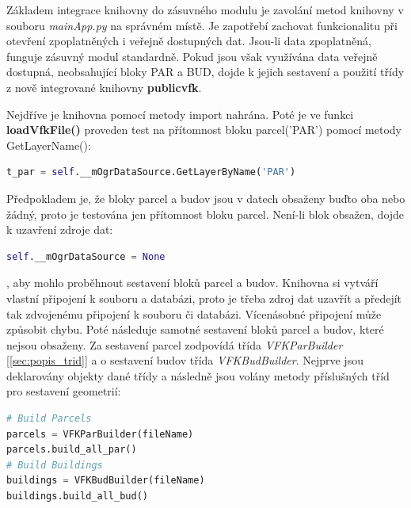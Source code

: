 Základem integrace knihovny do zásuvného modulu je
zavolání metod knihovny v souboru \textit{mainApp.py} na správném místě. Je zapotřebí zachovat
funkcionalitu při otevření zpoplatněných i veřejně dostupných dat. Jsou-li data
zpoplatněná, funguje zásuvný modul standardně. Pokud jsou však využívána data veřejně dostupná,
neobsahující bloky PAR a BUD, dojde k jejich sestavení a použití
třídy z nově integrované knihovny \textbf{publicvfk}.

Nejdříve je knihovna pomocí metody import nahrána. Poté je ve funkci
\textbf{loadVfkFile()} proveden test na přítomnost bloku parcel('PAR')
pomocí metody GetLayerName():
\begin{lstlisting}[language=Python, numbers=none]
t_par = self.__mOgrDataSource.GetLayerByName('PAR')
\end{lstlisting}
Předpokladem je, že bloky parcel a budov jsou v datech obsaženy buďto oba nebo žádný, proto je testována jen přítomnost bloku parcel. Není-li blok obsažen, dojde k uzavření zdroje dat:
\begin{lstlisting}[language=Python, numbers=none]
self.__mOgrDataSource = None
\end{lstlisting}
, aby mohlo proběhnout sestavení bloků parcel a budov. Knihovna si
vytváří vlastní připojení k  souboru a databázi, proto je
třeba zdroj dat uzavřít a předejít tak zdvojenému připojení k 
souboru či databázi. Vícenásobné připojení může způsobit chybu. Poté
následuje samotné sestavení bloků parcel a budov, které nejsou obsaženy. Za
sestavení parcel zodpovídá třída \textit{VFKParBuilder} [\ref{sec:popis_trid}] a o sestavení
budov třída \textit{VFKBudBuilder}. Nejprve jsou deklarovány objekty dané třídy a následně jsou
volány metody příslušných tříd pro sestavení geometrií:

\begin{lstlisting}[language=Python, numbers=none]
# Build Parcels
parcels = VFKParBuilder(fileName)
parcels.build_all_par()
# Build Buildings
buildings = VFKBudBuilder(fileName)
buildings.build_all_bud()
\end{lstlisting}

